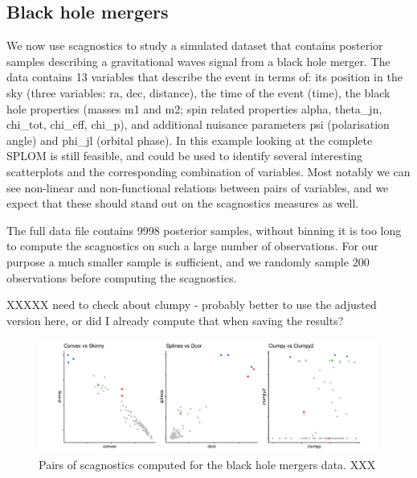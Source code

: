 \hypertarget{black-hole-mergers}{%
\subsection{Black hole mergers}\label{black-hole-mergers}}

We now use scagnostics to study a simulated dataset that contains
posterior samples describing a gravitational waves signal from a black
hole merger. The data contains 13 variables that describe the event in
terms of: its position in the sky (three variables: ra, dec, distance),
the time of the event (time), the black hole properties (masses m1 and
m2; spin related properties alpha, theta\_jn, chi\_tot, chi\_eff,
chi\_p), and additional nuisance parameters psi (polarisation angle) and
phi\_jl (orbital phase). In this example looking at the complete SPLOM
is still feasible, and could be used to identify several interesting
scatterplots and the corresponding combination of variables. Most
notably we can see non-linear and non-functional relations between pairs
of variables, and we expect that these should stand out on the
scagnostics measures as well.

The full data file contains 9998 posterior samples, without binning it
is too long to compute the scagnostics on such a large number of
observations. For our purpose a much smaller sample is sufficient, and
we randomly sample 200 observations before computing the scagnostics.

XXXXX need to check about clumpy - probably better to use the adjusted
version here, or did I already compute that when saving the results?

\begin{Schunk}
\begin{figure}
\includegraphics[width=1\linewidth]{mason-lee-laa-cook_files/figure-latex/bbh-scags-static-1} \caption[Pairs of scagnostics computed for the black hole mergers data]{Pairs of scagnostics computed for the black hole mergers data. XXX}\label{fig:bbh-scags-static}
\end{figure}
\end{Schunk}

